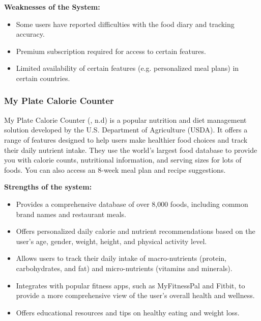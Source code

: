\documentclass{article}
\begin{document}
\textbf{Weaknesses of the System:}
\begin{itemize}
\item Some users have reported difficulties with the food diary and tracking accuracy.
\item Premium subscription required for access to certain features.
\item Limited availability of certain features (e.g. personalized meal plans) in certain countries.
\end{itemize}


\subsubsection{My Plate Calorie Counter}

My Plate Calorie Counter (, n.d) is a popular nutrition and diet management solution developed by the U.S. Department of Agriculture (USDA). It offers a range of features designed to help users make healthier food choices and track their daily nutrient intake. They use the world’s largest food database to provide you with calorie counts, nutritional information, and serving sizes for lots of foods. You can also access an 8-week meal plan and recipe suggestions.

\textbf{Strengths of the system:}
\begin{itemize}

\item Provides a comprehensive database of over 8,000 foods, including common brand names and restaurant meals.
\item Offers personalized daily calorie and nutrient recommendations based on the user's age, gender, weight, height, and physical activity level.
\item Allows users to track their daily intake of macro-nutrients (protein, carbohydrates, and fat) and micro-nutrients (vitamins and minerals).
\item Integrates with popular fitness apps, such as MyFitnessPal and Fitbit, to provide a more comprehensive view of the user's overall health and wellness.
\item Offers educational resources and tips on healthy eating and weight loss.

\end{itemize}
\end{document}
